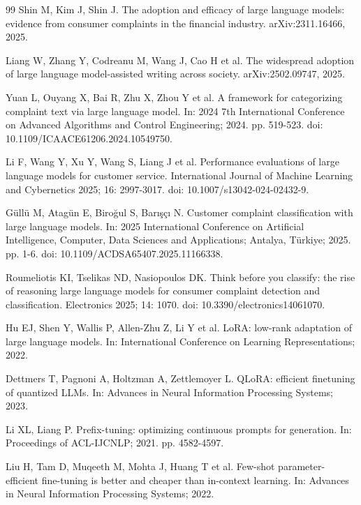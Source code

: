 \documentclass{elektr}
\begin{document}
\begin{thebibliography}{99}
 Shin M, Kim J, Shin J. The adoption and efficacy of large language models: evidence from consumer complaints in the financial industry. arXiv:2311.16466, 2025.

 Liang W, Zhang Y, Codreanu M, Wang J, Cao H et al. The widespread adoption of large language model-assisted writing across society. arXiv:2502.09747, 2025.

 Yuan L, Ouyang X, Bai R, Zhu X, Zhou Y et al. A framework for categorizing complaint text via large language model. In: 2024 7th International Conference on Advanced Algorithms and Control Engineering; 2024. pp. 519-523. doi: 10.1109/ICAACE61206.2024.10549750.

 Li F, Wang Y, Xu Y, Wang S, Liang J et al. Performance evaluations of large language models for customer service. International Journal of Machine Learning and Cybernetics 2025; 16: 2997-3017. doi: 10.1007/s13042-024-02432-9.

 Güllü M, Atagün E, Biroğul S, Barışçı N. Customer complaint classification with large language models. In: 2025 International Conference on Artificial Intelligence, Computer, Data Sciences and Applications; Antalya, Türkiye; 2025. pp. 1-6. doi: 10.1109/ACDSA65407.2025.11166338.

 Roumeliotis KI, Tselikas ND, Nasiopoulos DK. Think before you classify: the rise of reasoning large language models for consumer complaint detection and classification. Electronics 2025; 14: 1070. doi: 10.3390/electronics14061070.

 Hu EJ, Shen Y, Wallis P, Allen-Zhu Z, Li Y et al. LoRA: low-rank adaptation of large language models. In: International Conference on Learning Representations; 2022.

 Dettmers T, Pagnoni A, Holtzman A, Zettlemoyer L. QLoRA: efficient finetuning of quantized LLMs. In: Advances in Neural Information Processing Systems; 2023.

 Li XL, Liang P. Prefix-tuning: optimizing continuous prompts for generation. In: Proceedings of ACL-IJCNLP; 2021. pp. 4582-4597.

 Liu H, Tam D, Muqeeth M, Mohta J, Huang T et al. Few-shot parameter-efficient fine-tuning is better and cheaper than in-context learning. In: Advances in Neural Information Processing Systems; 2022.


\end{thebibliography}
\end{document}
